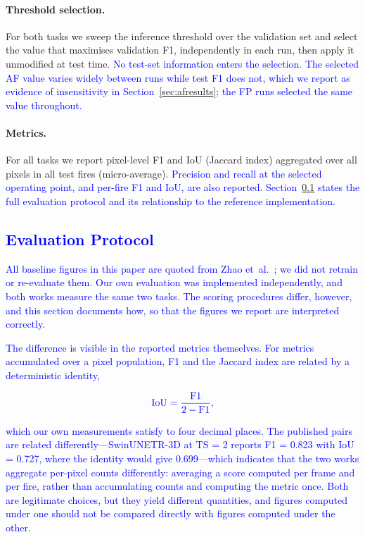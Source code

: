\documentclass[sensors,article,submit,moreauthors,pdftex]{Definitions/mdpi}
\newcommand{\rev}[1]{\textcolor{blue}{#1}}
\begin{document}
\paragraph*{Threshold selection.} For both tasks we sweep the inference threshold over the validation set and select the value that maximises validation F1, independently in each run, then apply it unmodified at test time. \rev{No test-set information enters the selection. The selected AF value varies widely between runs while test F1 does not, which we report as evidence of insensitivity in Section~\ref{sec:afresults}; the FP runs selected the same value throughout.}

\paragraph*{Metrics.} For all tasks we report pixel-level F1 and IoU (Jaccard index) aggregated over all pixels in all test fires (micro-average). \rev{Precision and recall at the selected operating point, and per-fire F1 and IoU, are also reported.} \rev{Section~\ref{sec:protocol} states the full evaluation protocol and its relationship to the reference implementation.}


\subsection{\rev{Evaluation Protocol}}
\label{sec:protocol}

\rev{All baseline figures in this paper are quoted from
Zhao et~al.~\cite{zhao2025tssatfire}; we did not retrain or re-evaluate them.
Our own evaluation was implemented independently, and both works measure the
same two tasks. The scoring procedures differ, however, and this section
documents how, so that the figures we report are interpreted correctly.}

\rev{The difference is visible in the reported metrics themselves. For metrics
accumulated over a pixel population, F1 and the Jaccard index are related by a
deterministic identity,}

\begin{equation}
\rev{\mathrm{IoU} = \frac{\mathrm{F1}}{2 - \mathrm{F1}},}
\label{eq:iou_identity}
\end{equation}

\rev{which our own measurements satisfy to four decimal places. The published
pairs are related differently---SwinUNETR-3D at TS = 2 reports F1 = 0.823 with
IoU = 0.727, where the identity would give 0.699---which indicates that the two
works aggregate per-pixel counts differently: averaging a score computed per
frame and per fire, rather than accumulating counts and computing the metric
once. Both are legitimate choices, but they yield different quantities, and
figures computed under one should not be compared directly with figures computed
under the other.}
\end{document}
